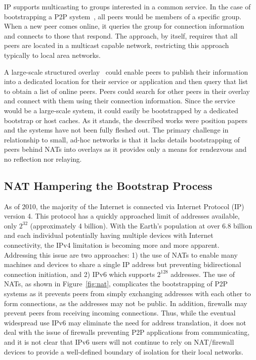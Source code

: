\documentclass[conference]{IEEEtran}
\begin{document}
IP supports multicasting to groups interested in a common service.  In the case
of bootstrapping a P2P system~\cite{pastry, locality_aware}, all peers would be
members of a specific group.  When a new peer comes online, it queries the
group for connection information and connects to those that respond.  The
approach, by itself, requires that all peers are located in a multicast capable
network, restricting this approach typically to local area networks.

A large-scale structured overlay~\cite{one_ring, p2p_bootstrap} could enable
peers to publish their information into a dedicated location for their service
or application and then query that list to obtain a list of online peers.
Peers could search for other peers in their overlay and connect with them using
their connection information.  Since the service would be a large-scale system,
it could easily be bootstrapped by a dedicated bootstrap or host caches.  As it
stands, the described works were position papers and the systems have not been
fully fleshed out.  The primary challenge in relationship to small, ad-hoc
networks is that it lacks details bootstrapping of peers behind NATs into
overlays as it provides only a means for rendezvous and no reflection nor
relaying.

\subsection{NAT Hampering the Bootstrap Process}

As of 2010, the majority of the Internet is connected via Internet Protocol
(IP) version 4.  This protocol has a quickly approached limit of addresses
available,  only $2^{32}$ (approximately 4 billion).  With the Earth's
population at over 6.8 billion and each individual potentially having multiple
devices with Internet connectivity, the IPv4 limitation is becoming more and
more apparent.  Addressing this issue are two approaches:  1) the use of NATs
to enable many machines and devices to share a single IP address but preventing
bidirectional connection initiation, and 2) IPv6 which supports $2^{128}$
addresses.  The use of NATs, as shown in Figure~\ref{fig:nat}, complicates the
bootstrapping of P2P systems as it prevents peers from simply exchanging
addresses with each other to form connections, as the addresses may not be
public.  In addition, firewalls may prevent peers from receiving incoming
connections.  Thus, while the eventual widespread use IPv6 may eliminate the
need for address translation, it does not deal with the issue of firewalls
preventing P2P applications from communicating, and it is not clear that IPv6
users will not continue to rely on NAT/firewall devices to provide a
well-defined boundary of isolation for their local networks.
\end{document}
